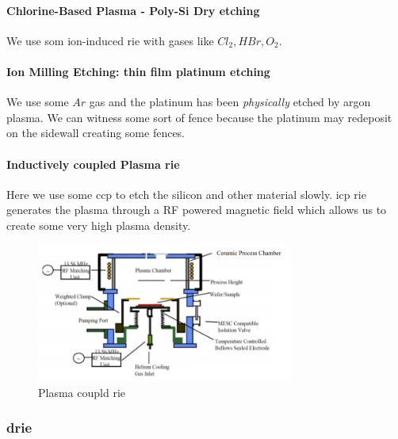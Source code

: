 \documentclass[
]{article}
\begin{document}
\hypertarget{chlorine-based-plasma---poly-si-dry-etching}{%
\paragraph{Chlorine-Based Plasma - Poly-Si Dry
etching}\label{chlorine-based-plasma---poly-si-dry-etching}}

We use som ion-induced {rie} with gases like \(Cl_2, HBr, O_2\).

\hypertarget{ion-milling-etching-thin-film-platinum-etching}{%
\paragraph{Ion Milling Etching: thin film platinum
etching}\label{ion-milling-etching-thin-film-platinum-etching}}

We use some \(Ar\) gas and the platinum has been \emph{physically}
etched by argon plasma. We can witness some sort of fence because the
platinum may redeposit on the sidewall creating some fences.

\hypertarget{inductively-coupled-plasma-rie}{%
\paragraph{\texorpdfstring{Inductively coupled Plasma
{rie}}{Inductively coupled Plasma rie}}\label{inductively-coupled-plasma-rie}}

Here we use some {ccp} to etch the silicon and other material slowly.
{icp} {rie} generates the plasma through a RF powered magnetic field
which allows us to create some very high plasma density.

\begin{figure}
\hypertarget{fig:enter-label}{%
\centering
\includegraphics[width=0.75\textwidth,height=\textheight]{Setup_plasma_rie.png}
\caption{Plasma coupld {rie}}\label{fig:enter-label}
}
\end{figure}

\hypertarget{drie}{%
\subsubsection{\texorpdfstring{{drie}}{drie}}\label{drie}}
\end{document}
